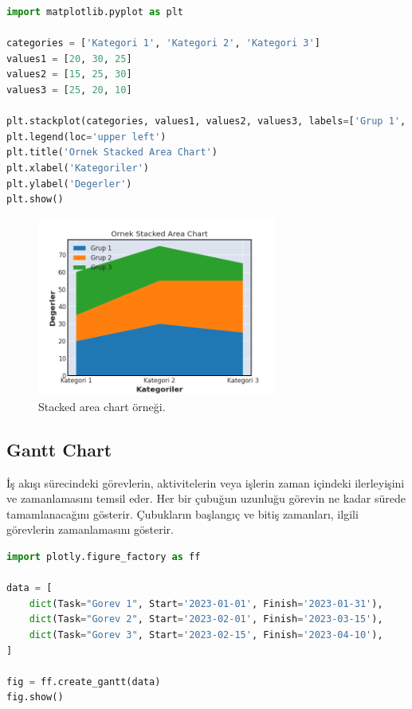 \begin{lstlisting}[language=Python]
import matplotlib.pyplot as plt

categories = ['Kategori 1', 'Kategori 2', 'Kategori 3']
values1 = [20, 30, 25]
values2 = [15, 25, 30]
values3 = [25, 20, 10]

plt.stackplot(categories, values1, values2, values3, labels=['Grup 1', 'Grup 2', 'Grup 3'])
plt.legend(loc='upper left')
plt.title('Ornek Stacked Area Chart')
plt.xlabel('Kategoriler')
plt.ylabel('Degerler')
plt.show()
\end{lstlisting}

\begin{figure}[h]
    \centering
    \includegraphics[width=0.7\textwidth]{images/stacked_area_chart.png}
    \caption{Stacked area chart örneği.}
    \label{fig:enter-label}
\end{figure}

\newpage

\subsection{Gantt Chart}
İş akışı sürecindeki görevlerin, aktivitelerin veya işlerin zaman içindeki ilerleyişini ve zamanlamasını temsil eder. Her bir çubuğun uzunluğu görevin ne kadar sürede tamamlanacağını gösterir. Çubukların başlangıç ve bitiş zamanları, ilgili görevlerin zamanlamasını gösterir.

\begin{lstlisting}[language=Python]
import plotly.figure_factory as ff

data = [
    dict(Task="Gorev 1", Start='2023-01-01', Finish='2023-01-31'),
    dict(Task="Gorev 2", Start='2023-02-01', Finish='2023-03-15'),
    dict(Task="Gorev 3", Start='2023-02-15', Finish='2023-04-10'),
]

fig = ff.create_gantt(data)
fig.show()
\end{lstlisting}

